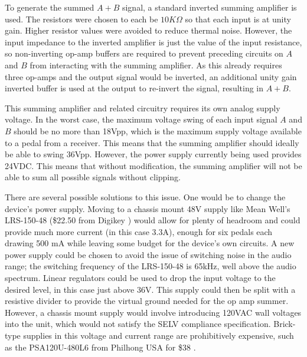 \documentclass{article}
\begin{document}
	To generate the summed $A+B$ signal, a standard inverted summing amplifier is used.  The resistors were chosen to each be $10K\Omega$ so that each input is at unity gain.  Higher resistor values were avoided to reduce thermal noise.  However, the input impedance to the inverted amplifier is just the value of the input resistance, so non-inverting op-amp buffers are required to prevent preceding circuits on $A$ and $B$ from interacting with the summing amplifier.  As this already requires three op-amps and the output signal would be inverted, an additional unity gain inverted buffer is used at the output to re-invert the signal, resulting in $A+B$.

	This summing amplifier and related circuitry requires its own analog supply voltage.  In the worst case, the maximum voltage swing of each input signal $A$ and $B$ should be no more than 18Vpp, which is the maximum supply voltage available to a pedal from a receiver.  This means that the summing amplifier should ideally be able to swing 36Vpp.  However, the power supply currently being used provides 24VDC.  This means that without modification, the summing amplifier will not be able to sum all possible signals without clipping.

	There are several possible solutions to this issue.  One would be to change the device's power supply.  Moving to a chassis mount 48V supply like Mean Well's LRS-150-48 \cite{datasheet:LRS-150-48} (\$22.50 from Digikey \cite{Digikey:LRS-150-48}) would allow for plenty of headroom and could provide much more current (in this case 3.3A), enough for six pedals each drawing 500 mA while leaving some budget for the device's own circuits.  A new power supply could be chosen to avoid the issue of switching noise in the audio range; the switching frequency of the LRS-150-48 is 65kHz, well above the audio spectrum.  Linear regulators could be used to drop the input voltage to the desired level, in this case just above 36V.  This supply could then be split with a resistive divider to provide the virtual ground needed for the op amp summer.  However, a chassis mount supply would involve introducing 120VAC wall voltages into the unit, which would not satisfy the SELV compliance specification.  Brick-type supplies in this voltage and current range are prohibitively expensive, such as the PSA120U-480L6 from Philhong USA for \$38 \cite{Digikey:PSA120U-480L6}.
\end{document}
